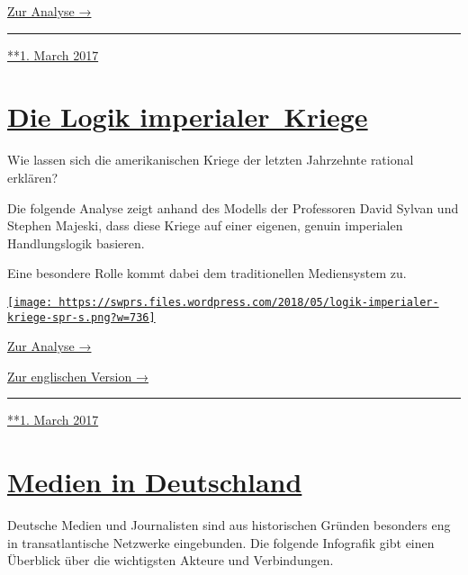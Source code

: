 \href{https://swprs.org/trump-medien-geopolitik/}{Zur Analyse →}

\begin{center}\rule{0.5\linewidth}{\linethickness}\end{center}

\href{https://swprs.org/2017/03/01/trump-medien-geopolitik/}{**1. March
2017}

\hypertarget{die-logik-imperialer-kriege}{%
\section{\texorpdfstring{\href{https://swprs.org/2017/03/01/die-logik-imperialer-kriege/}{Die
Logik
imperialer~Kriege}}{Die Logik imperialer~Kriege}}\label{die-logik-imperialer-kriege}}

Wie lassen sich die amerikanischen Kriege der letzten Jahrzehnte
rational erklären?

Die folgende Analyse zeigt anhand des Modells der Professoren David
Sylvan und Stephen Majeski, dass diese Kriege auf einer eigenen, genuin
imperialen Handlungslogik basieren.

Eine besondere Rolle kommt dabei dem traditionellen Mediensystem zu.

\href{https://swprs.org/logik-imperialer-kriege/}{\texttt{[image: https://swprs.files.wordpress.com/2018/05/logik-imperialer-kriege-spr-s.png?w=736]}}

\href{https://swprs.org/logik-imperialer-kriege/}{Zur Analyse →}

\href{https://swprs.org/us-foreign-policy/}{Zur englischen Version →}

\begin{center}\rule{0.5\linewidth}{\linethickness}\end{center}

\href{https://swprs.org/2017/03/01/die-logik-imperialer-kriege/}{**1.
March 2017}

\hypertarget{medien-in-deutschland}{%
\section{\texorpdfstring{\href{https://swprs.org/2017/03/01/medien-in-deutschland/}{Medien
in Deutschland}}{Medien in Deutschland}}\label{medien-in-deutschland}}

Deutsche Medien und Journalisten sind aus historischen Gründen besonders
eng in trans­at­lan­tische Netz­werke eingebunden. Die folgende
Info­grafik gibt einen Über­blick über die wich­tigsten Akteure und
Ver­bindungen.

